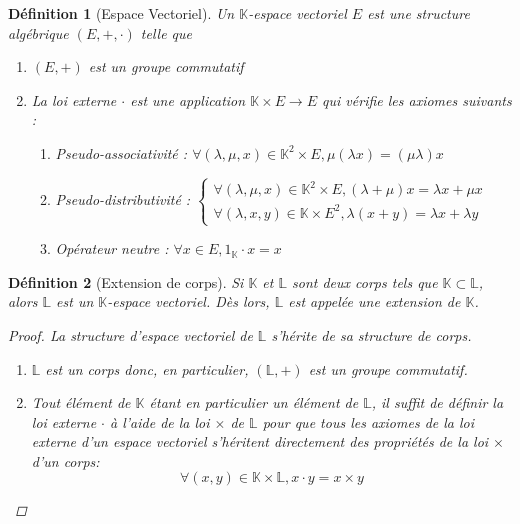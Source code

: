 \documentclass[a4paper,12pt,french,draft]{report}
\newtheorem{definition}{Définition}[section]
\begin{document}
			
			\begin{definition}[Espace Vectoriel]
				Un \(\mathbb{K}\)-espace vectoriel \(E\)  est une structure algébrique \( (E, + , \cdot)\) telle que
				\begin{enumerate}
					\item \( (E, +) \) est un groupe commutatif
					\item La loi externe \( \cdot \) est une application \( \mathbb{K} \times E \longrightarrow E \) qui vérifie les axiomes suivants :
						\begin{enumerate}
							\item Pseudo-associativité :
								\(
								\forall (\lambda, \mu, x) \in \mathbb{K}^2 \times E, \mu(\lambda x) = (\mu \lambda) x
								\)
							\item Pseudo-distributivité :
								\(
								\left\{
									\begin{array}{ll}
										\forall (\lambda, \mu, x) \in \mathbb{K}^2 \times E , (\lambda + \mu)x = \lambda x + \mu x \\
										\forall (\lambda, x, y) \in \mathbb{K} \times E^2 , \lambda(x + y) = \lambda x + \lambda y
									\end{array}
								\right.
								\)
							\item Opérateur neutre :
								\(
								\forall x \in E, 1_\mathbb{K} \cdot x = x
								\)
						\end{enumerate}
				\end{enumerate}
				
			\end{definition}
			
			
			\begin{definition}[Extension de corps]
			
				Si \( \mathbb{K} \) et \( \mathbb{L} \) sont deux corps tels que \(\mathbb{K} \subset  \mathbb{L} \), alors
				\(\mathbb{L}\) est un \(\mathbb{K}\)-espace vectoriel. Dès lors, \(\mathbb{L}\) est appelée une \emph{extension} de \(\mathbb{K}\).
			
				\begin{proof}
					La structure d'espace vectoriel de \(\mathbb{L}\) s'hérite de sa structure de corps.
					\begin{enumerate}
						\item \(\mathbb{L}\) est un corps donc, en particulier, \((\mathbb{L}, +)\) est un groupe commutatif.
						\item Tout élément de \(\mathbb{K}\) étant en particulier un élément de \(\mathbb{L}\), il suffit de définir la loi
						externe \(\cdot\) à l'aide de la loi \( \times \) de \(\mathbb{L}\) pour que tous les axiomes de la loi externe d'un espace vectoriel s'héritent directement des propriétés de la loi \( \times \) d'un corps:
							\[
							\forall (x, y) \in \mathbb{K} \times \mathbb{L}, x \cdot y = x \times y
							\]
					\end{enumerate}
				\end{proof}
			\end{definition}
			
\end{document}
